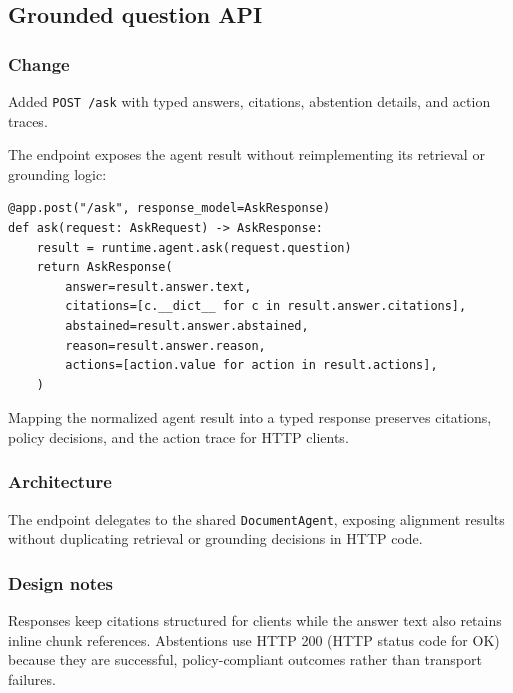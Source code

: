 
\subsection{Grounded question API}


\subsubsection{Change}

Added \texttt{POST\ /ask} with typed answers, citations, abstention details, and action traces.

The endpoint exposes the agent result without reimplementing its retrieval or grounding logic:

\begin{verbatim}
@app.post("/ask", response_model=AskResponse)
def ask(request: AskRequest) -> AskResponse:
    result = runtime.agent.ask(request.question)
    return AskResponse(
        answer=result.answer.text,
        citations=[c.__dict__ for c in result.answer.citations],
        abstained=result.answer.abstained,
        reason=result.answer.reason,
        actions=[action.value for action in result.actions],
    )
\end{verbatim}

Mapping the normalized agent result into a typed response preserves citations, policy decisions, and the action trace for HTTP clients.

\subsubsection{Architecture}

The endpoint delegates to the shared \texttt{DocumentAgent}, exposing alignment results without duplicating retrieval or grounding decisions in HTTP code.

\subsubsection{Design notes}

Responses keep citations structured for clients while the answer text also retains inline chunk references. Abstentions use HTTP 200 (HTTP status code for OK) because they are successful, policy-compliant outcomes rather than transport failures.

